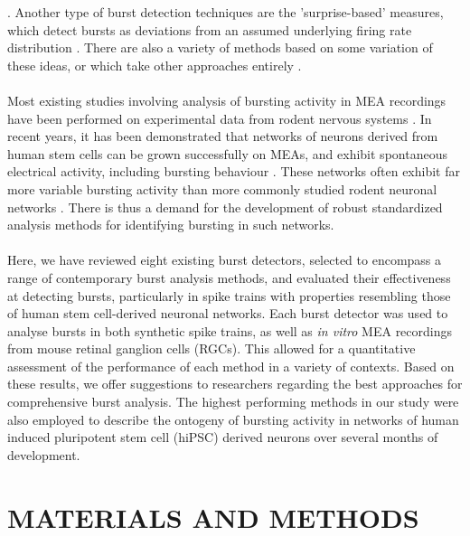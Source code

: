 \documentclass[12pt, titlepage]{article}
\begin{document}
	\cite{Cocatre-Zilgien1992,Selinger2007,Pasquale2010,Kaneoke1996,Bakkum2013,Kapucu2012}.
	 Another type of burst detection techniques are the 'surprise-based' measures, which detect bursts as deviations from an assumed underlying firing rate distribution \cite{Legendy1985,Ko2012,Gourevitch2007}. There are also a variety of methods based on some variation of these ideas, or which take other approaches entirely \cite{Hennig2011,Tokdar2010,Turnbull2005,Tam2002,Xia2003,Wagenaar2005,Weihberger2013}.
	\\ \\ Most existing studies involving analysis of bursting activity in MEA recordings have been performed on experimental data from rodent nervous systems \cite{Charlesworth2015,Mazzoni2007}. In recent years, it has been demonstrated that networks of neurons derived from human stem cells can be grown successfully on MEAs, and exhibit spontaneous electrical activity, including bursting behaviour \cite{Illes2007,Heikkila2009}. %
	These networks often exhibit far more variable bursting activity than more commonly studied rodent neuronal networks \cite{Kapucu2012}.
	There is thus a demand for the development of robust standardized analysis methods for identifying bursting in such networks.
	\\ \\ Here, we have reviewed eight existing burst detectors, selected to encompass a range of contemporary burst analysis methods, and evaluated their effectiveness at detecting bursts, particularly in spike trains with properties resembling those of human stem cell-derived neuronal networks. Each burst detector was used to analyse bursts in both synthetic spike trains, as well as \textit{in vitro} MEA recordings from mouse retinal ganglion cells (RGCs). This allowed for a quantitative assessment of the performance of each method in a variety of contexts. Based on these results, we offer suggestions to researchers regarding the best approaches for comprehensive burst analysis. The highest performing methods in our study were also employed to describe the ontogeny of bursting activity in networks of human induced pluripotent stem cell (hiPSC) derived neurons over several months of development. 
	\section*{MATERIALS AND METHODS}
\end{document}

